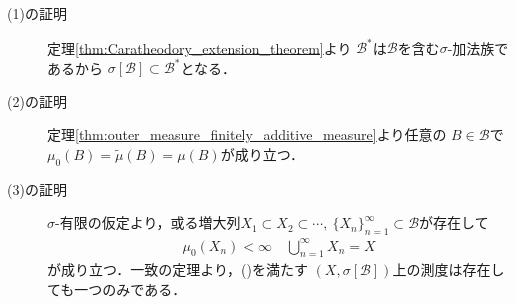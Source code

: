 		\begin{prf}\mbox{}
			\begin{description}
				\item[(1)の証明]
					定理\ref{thm:Caratheodory_extension_theorem}より
					$\mathcal{B}^*$は$\mathcal{B}$を含む$\sigma$-加法族であるから
					$\sigma[\mathcal{B}] \subset \mathcal{B}^*$となる．
				
				\item[(2)の証明]
					定理\ref{thm:outer_measure_finitely_additive_measure}より任意の
					$B \in \mathcal{B}$で$\mu_0(B) = \tilde{\mu}(B) = \mu(B)$が成り立つ．
				
				\item[(3)の証明]
					$\sigma$-有限の仮定より，或る増大列$X_1 \subset X_2 \subset \cdots
					,\ \{X_n\}_{n=1}^\infty \subset \mathcal{B}$が存在して
					\begin{align}
						\mu_0 (X_n) < \infty \quad \bigcup_{n=1}^\infty X_n = X
						\label{eq:appendix_finite_additive_measure_expansion_3}
					\end{align}
					が成り立つ．一致の定理より，()を満たす
					$\left( X,\sigma[\mathcal{B}] \right)$上の測度は存在しても一つのみである．
					

\end{description}
\end{prf}
